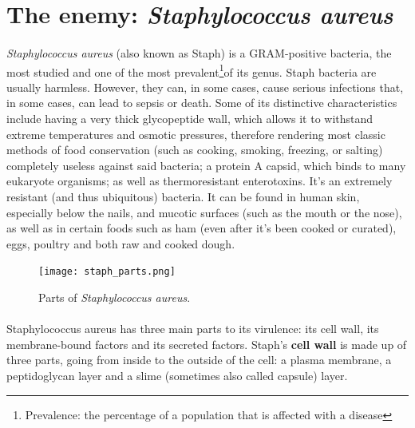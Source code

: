 \section{The enemy: \emph{Staphylococcus aureus}}
\paragraph{}\emph{Staphylococcus aureus} (also known as Staph) is a GRAM-positive bacteria, the most studied and one of the most prevalent\footnote{Prevalence: the percentage of a population that is affected with a disease}of its genus. Staph bacteria are usually harmless. However, they can, in some cases, cause serious infections that, in some cases, can lead to sepsis or death. Some of its distinctive characteristics include having a very thick glycopeptide wall, which allows it to withstand extreme temperatures and osmotic pressures, therefore rendering most classic methods of food conservation (such as cooking, smoking, freezing, or salting) completely useless against said bacteria; a protein A capsid, which binds to many eukaryote organisms; as well as thermoresistant enterotoxins. It's an extremely resistant (and thus ubiquitous) bacteria. It can be found in human skin, especially below the nails, and mucotic surfaces (such as the mouth or the nose), as well as in certain foods such as ham (even after it's been cooked or curated), eggs, poultry and both raw and cooked dough.\newpage
\begin{figure}\begin{center}\texttt{[image: staph\_parts.png]}\end{center}\caption{Parts of \emph{Staphylococcus aureus}\cite{kongCommunityAssociatedMethicillinResistantStaphylococcus2016}.}\end{figure}\paragraph{}Staphylococcus aureus has three main parts to its virulence: its cell wall, its membrane-bound factors and its secreted factors. Staph's \textbf{cell wall} is made up of three parts, going from inside to the outside of the cell: a plasma membrane, a peptidoglycan layer and a slime (sometimes also called capsule) layer\cite{kongCommunityAssociatedMethicillinResistantStaphylococcus2016}.
